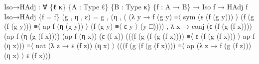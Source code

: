 \documentclass[
  11pt,
  oneside,
  article]{memoir}
\newenvironment{Shaded}{}{}
\newcommand{\NormalTok}[1]{#1}
\newcommand{\OtherTok}[1]{\textcolor[rgb]{0.00,0.44,0.13}{#1}}
\theoremstyle{definition}
\theoremstyle{plain}
\newcommand{\0}{\textsf{0}}
\newcommand{\1}{\tn{\textsf{1}}}
\begin{document}
\begin{Shaded}
\begin{Highlighting}[]
\NormalTok{Iso→HAdj }\OtherTok{:} \OtherTok{∀} \OtherTok{\{}\NormalTok{ℓ κ}\OtherTok{\}} \OtherTok{\{}\NormalTok{A }\OtherTok{:}\NormalTok{ Type ℓ}\OtherTok{\}} \OtherTok{\{}\NormalTok{B }\OtherTok{:}\NormalTok{ Type κ}\OtherTok{\}} \OtherTok{\{}\NormalTok{f }\OtherTok{:}\NormalTok{ A }\OtherTok{→}\NormalTok{ B}\OtherTok{\}}
           \OtherTok{→}\NormalTok{ Iso f }\OtherTok{→}\NormalTok{ HAdj f}
\NormalTok{Iso→HAdj }\OtherTok{\{}\NormalTok{f }\OtherTok{=}\NormalTok{ f}\OtherTok{\}} \OtherTok{(}\NormalTok{g , η , ε}\OtherTok{)} \OtherTok{=}
\NormalTok{    g , }\OtherTok{(}\NormalTok{η }
\NormalTok{    , }\OtherTok{(} \OtherTok{(λ}\NormalTok{ y }\OtherTok{→} 
\NormalTok{           f }\OtherTok{(}\NormalTok{g y}\OtherTok{)}\NormalTok{         ≡〈 sym }\OtherTok{(}\NormalTok{ε }\OtherTok{(}\NormalTok{f }\OtherTok{(}\NormalTok{g y}\OtherTok{)))}\NormalTok{ 〉 }
          \OtherTok{(}\NormalTok{f }\OtherTok{(}\NormalTok{g }\OtherTok{(}\NormalTok{f }\OtherTok{(}\NormalTok{g y}\OtherTok{)))}\NormalTok{ ≡〈 ap f }\OtherTok{(}\NormalTok{η }\OtherTok{(}\NormalTok{g y}\OtherTok{))}\NormalTok{ 〉 }
          \OtherTok{(}\NormalTok{f }\OtherTok{(}\NormalTok{g y}\OtherTok{)}\NormalTok{         ≡〈 ε y 〉 }
          \OtherTok{(}\NormalTok{y               □}\OtherTok{))))} 
\NormalTok{      , }\OtherTok{λ}\NormalTok{ x }\OtherTok{→}\NormalTok{ conj }\OtherTok{(}\NormalTok{ε }\OtherTok{(}\NormalTok{f }\OtherTok{(}\NormalTok{g }\OtherTok{(}\NormalTok{f x}\OtherTok{))))} \OtherTok{(}\NormalTok{ap f }\OtherTok{(}\NormalTok{η }\OtherTok{(}\NormalTok{g }\OtherTok{(}\NormalTok{f x}\OtherTok{))))} 
                   \OtherTok{(}\NormalTok{ap f }\OtherTok{(}\NormalTok{η x}\OtherTok{))} \OtherTok{(}\NormalTok{ε }\OtherTok{(}\NormalTok{f x}\OtherTok{))} 
                   \OtherTok{(((}\NormalTok{f }\OtherTok{(}\NormalTok{g }\OtherTok{(}\NormalTok{f }\OtherTok{(}\NormalTok{g }\OtherTok{(}\NormalTok{f x}\OtherTok{))))}\NormalTok{ ≡〈 ε }\OtherTok{(}\NormalTok{f }\OtherTok{(}\NormalTok{g }\OtherTok{(}\NormalTok{f x}\OtherTok{)))}\NormalTok{ 〉 ap f }\OtherTok{(}\NormalTok{η x}\OtherTok{)))} 
\NormalTok{                    ≡〈 nat }\OtherTok{(λ}\NormalTok{ z }\OtherTok{→}\NormalTok{ ε }\OtherTok{(}\NormalTok{f z}\OtherTok{))} \OtherTok{(}\NormalTok{η x}\OtherTok{)}\NormalTok{ 〉 }
                    \OtherTok{(((}\NormalTok{f }\OtherTok{(}\NormalTok{g }\OtherTok{(}\NormalTok{f }\OtherTok{(}\NormalTok{g }\OtherTok{(}\NormalTok{f x}\OtherTok{))))}\NormalTok{ ≡〈 ap }\OtherTok{(λ}\NormalTok{ z }\OtherTok{→}\NormalTok{ f }\OtherTok{(}\NormalTok{g }\OtherTok{(}\NormalTok{f z}\OtherTok{)))} \OtherTok{(}\NormalTok{η x}\OtherTok{)}\NormalTok{ 〉 ε }\OtherTok{(}\NormalTok{f x}\OtherTok{)))} 

\end{Highlighting}
\end{Shaded}
\end{document}
